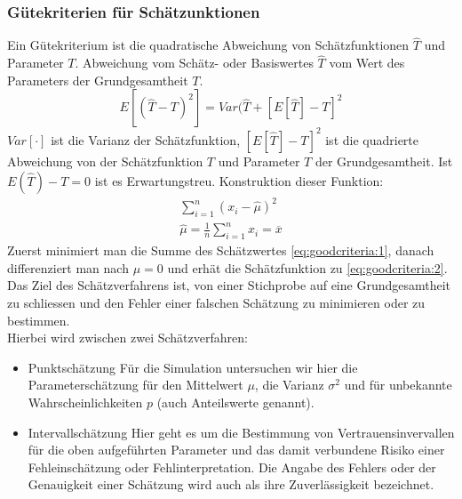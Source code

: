 \subsubsection{Gütekriterien für Schätzunktionen}
Ein Gütekriterium ist die quadratische Abweichung von Schätzfunktionen $\widehat{T}$ und Parameter $T$. Abweichung vom Schätz- oder Basiswertes $\widehat{T}$ vom Wert des Parameters der Grundgesamtheit $T$.
\begin{equation}
E[(\widehat{T}-T)^2] = Var(\widehat{T} + [E[\widehat{T}]-T]^2
\end{equation}
$Var[\cdot]$ ist die Varianz der Schätzfunktion, $[E[\widehat{T}]-T]^2$ ist die quadrierte Abweichung von der Schätzfunktion $T$ und Parameter $T$ der Grundgesamtheit. Ist $E(\widehat{T})-T=0$ ist es Erwartungstreu.
Konstruktion dieser Funktion:
\begin{align}
\sum_{i=1}^n(x_i-\widehat{\mu})^2 \label{eq:goodcriteria:1} \\
\widehat{\mu}=\frac{1}{n}\sum_{i=1}^n x_i = \overline{x} \label{eq:goodcriteria:2}
\end{align}
Zuerst minimiert man die Summe des Schätzwertes \autoref{eq:goodcriteria:1}, danach differenziert man nach $\mu = 0$ und erhät die Schätzfunktion zu \autoref{eq:goodcriteria:2}. \\
Das Ziel des Schätzverfahrens ist, von einer Stichprobe auf eine Grundgesamtheit zu schliessen und den Fehler einer falschen Schätzung zu minimieren oder zu bestimmen.\\
Hierbei wird zwischen zwei Schätzverfahren:
\pagebreak[4]
\begin{itemize}
\item Punktschätzung
\subitem Für die Simulation untersuchen wir hier die Parameterschätzung für den Mittelwert $\mu$, die Varianz $\sigma^2$ und für unbekannte Wahrscheinlichkeiten $p$ (auch Anteilswerte genannt).
\nopagebreak[4]
\item Intervallschätzung
\subitem Hier geht es um die Bestimmung von Vertrauensinvervallen für die oben aufgeführten Parameter und das damit verbundene Risiko einer Fehleinschätzung oder Fehlinterpretation. Die Angabe des Fehlers oder der Genauigkeit einer Schätzung wird auch als ihre Zuverlässigkeit bezeichnet.
\end{itemize}
